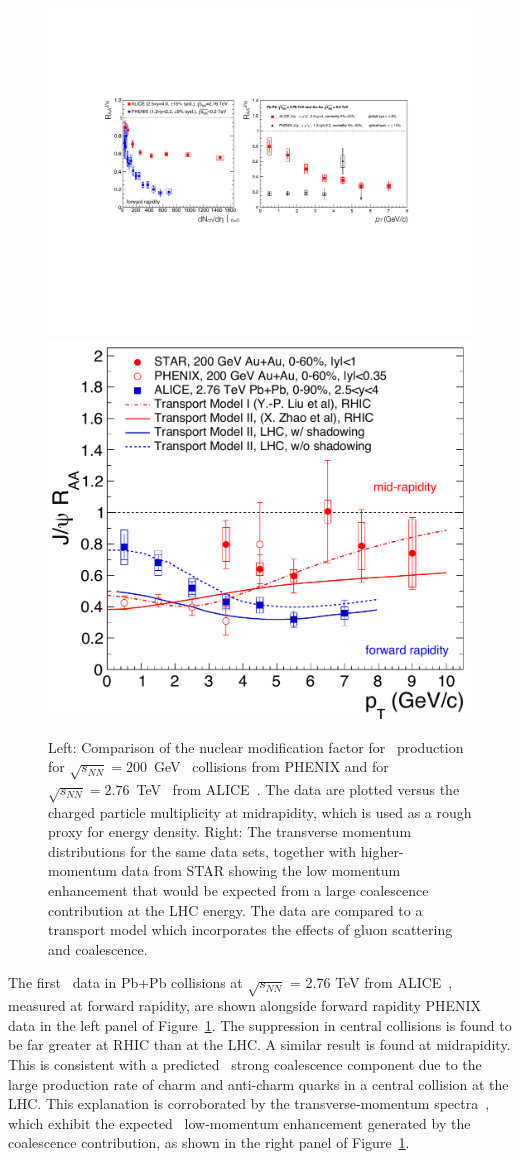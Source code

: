\begin{figure}[!ht]
 \centering
 \includegraphics[width=0.435\linewidth]{fig/ALICE_PHENIX_Jpsi_cropped}
 \includegraphics[width=0.46\linewidth]{fig/Jpsi_raa_vs_pt}
 \caption[Comparison of RHIC and LHC data on \Jpsi\ production]{
 Left: Comparison of the nuclear modification factor for \JPsi\ production for $\sqrt{s_{NN}}=200$~GeV \AuAu\ collisions from
PHENIX and for $\sqrt{s_{NN}}=2.76$~TeV \PbPb\ from ALICE~\cite{Andronic:2014zha}. The data are plotted versus the charged
particle multiplicity at midrapidity, which is used as a rough proxy for energy density. 
Right: The transverse momentum
distributions for the same data sets,
together with higher-momentum data from STAR\cite{Adamczyk:2012ey}
showing the low momentum enhancement that would be expected from a
large coalescence contribution at the LHC energy.
The data are compared to a transport model\cite{Liu:2009nb}
which incorporates the effects of gluon scattering and coalescence.
}
\label{fig:ALICE_PHENIX_Jpsi_RAA}
\end{figure}
	
	
The first \Jpsi\
data in Pb+Pb collisions at $\sqrt{s_{NN}}$ = 2.76 TeV from ALICE~\cite{Abelev:2012rv}, measured at forward
rapidity, are shown alongside forward rapidity PHENIX data in the left panel of Figure~\ref{fig:ALICE_PHENIX_Jpsi_RAA}. 
The suppression in central collisions is found to be far greater at RHIC than at the LHC. A similar result is found
at midrapidity. This is consistent with a predicted~\cite{Zhao:2011cv} strong coalescence component due to the 
large production rate of charm and anti-charm quarks in a central collision at the LHC. This explanation is 
corroborated by the transverse-momentum spectra~\cite{Adare:2006ns,Adamczyk:2012ey,Abelev:2013ila}, 
which exhibit the expected~\cite{Zhao:2011cv,Liu:2009nb}
low-momentum enhancement generated by the coalescence contribution, 
as shown in the right panel of 
Figure~\ref{fig:ALICE_PHENIX_Jpsi_RAA}.


